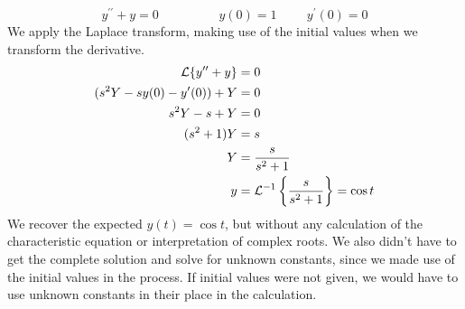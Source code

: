 \documentclass[fleqn,letterpaper]{report}
\begin{document}
\begin{example}
\begin{equation*}
y^{\prime \prime} + y = 0 \hspace{2cm} y(0) = 1 \hspace{1cm}
y^\prime(0) = 0
\end{equation*}
We apply the Laplace transform, making use of the initial
values when we transform the derivative.
\begin{align*}
\mathcal{L} \{ y^{\prime \prime} + y \} & = 0 \\
(s^2Y - sy(0) - y^\prime(0)) + Y & = 0 \\
s^2Y - s + Y & = 0 \\
(s^2+1)Y & = s \\
Y & = \frac{s}{s^2 + 1} \\
y & = \mathcal{L}^{-1} \left\{ \frac{s}{s^2+1} \right\} = \cos t
\end{align*} 
We recover the expected $y(t) = \cos t$, but without any
calculation of the characteristic equation or interpretation
of complex roots. We also didn't have to get the complete
solution and solve for unknown constants, since we made use of
the initial values in the process. If initial values were not
given, we would have to use unknown constants in their place
in the calculation.
\end{example}
\end{document}
